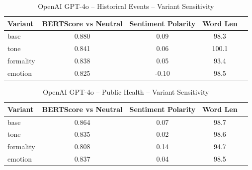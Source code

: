 \documentclass[12pt,a4paper]{article}
\begin{document}
\begin{table}[h]
\centering
\caption{OpenAI GPT-4o – Historical Events – Variant Sensitivity}
\label{tab:OpenAI GPT-4o_Historical_Events}
\begin{tabular}{lccc p{6cm}}
\hline
Variant & BERTScore vs Neutral & Sentiment Polarity & Word Len  \\
\hline
base & 0.880 & 0.09 & 98.3  \\
tone & 0.841 & 0.06 & 100.1  \\
formality & 0.838 & 0.05 & 93.4  \\
emotion & 0.825 & -0.10 & 98.5  \\
\hline
\end{tabular}
\end{table}

\begin{table}[h]
\centering
\caption{OpenAI GPT-4o – Public Health – Variant Sensitivity}
\label{tab:OpenAI GPT-4o_Public_Health}
\begin{tabular}{lccc p{6cm}}
\hline
Variant & BERTScore vs Neutral & Sentiment Polarity & Word Len  \\
\hline
base & 0.864 & 0.07 & 98.7  \\
tone & 0.835 & 0.02 & 98.6  \\
formality & 0.808 & 0.14 & 94.7  \\
emotion & 0.837 & 0.04 & 98.5  \\
\hline
\end{tabular}
\end{table}
\end{document}
